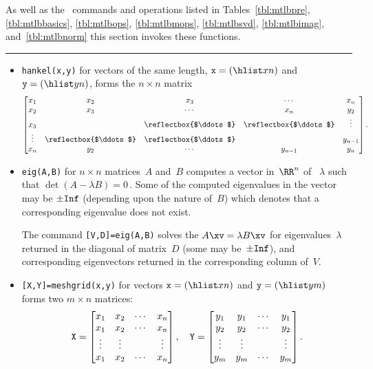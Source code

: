 \begin{table}
\caption{As well as the \script\ commands and operations listed in Tables~\ref{tbl:mtlbpre}, \ref{tbl:mtlbbasics}, \ref{tbl:mtlbops}, \ref{tbl:mtlbmops}, \ref{tbl:mtlbsvd}, \ref{tbl:mtlbimag}, and~\ref{tbl:mtlbnorm} this section invokes these functions.} \label{tbl:mtlbexpf}
\smallskip\hrule
\begin{minipage}{\linewidth}
\begin{itemize}
\item {}\verb|hankel(x,y)| for vectors of the same length, \(\verb|x|=(\hlist xn)\) and \(\verb|y|=(\hlist yn)\), forms the \(n\times n\) matrix
\def\adots{\reflectbox{$\ddots$}}
\begin{equation*}
\begin{bmatrix} 
x_1&x_2&x_3&\cdots&x_n \\
x_2&x_3&\cdots&x_n&y_2\\
x_3&&\adots&\adots&\vdots\\
\vdots&\adots&\adots&&y_{n-1}\\
x_n&y_2&\cdots&y_{n-1}&y_n
\end{bmatrix}.
\end{equation*}

\item {}\verb|eig(A,B)| for \(n\times n\) matrices~\(A\) and~\(B\) computes a vector in~\(\RR^n\) of ~\(\lambda\) such that \(\det(A-\lambda B)=0\)\,.
Some of the computed eigenvalues in the vector may be \(\pm\verb|Inf|\) (depending upon the nature of~\(B\)) which denotes that a corresponding eigenvalue does not exist.

The command \verb|[V,D]=eig(A,B)| solves the  \(A\xv=\lambda B\xv\) for eigenvalues~\(\lambda\) returned in the diagonal of matrix~\(D\) (some may be~\(\pm\verb|Inf|\)), and corresponding eigenvectors returned in the corresponding column of~\(V\).

\item {}\verb|[X,Y]=meshgrid(x,y)|  for vectors \(\verb|x|=(\hlist xn)\) and \(\verb|y|=(\hlist ym)\) forms two \(m\times n\) matrices:
\begin{equation*}
\verb|X|=\begin{bmatrix} x_1&x_2&\cdots&x_n\\
 x_1&x_2&\cdots&x_n\\
 \vdots&\vdots&&\vdots\\
 x_1&x_2&\cdots&x_n \end{bmatrix},
 \quad
\verb|Y|=\begin{bmatrix} y_1&y_1&\cdots&y_1\\
 y_2&y_2&\cdots&y_2\\
 \vdots&\vdots&&\vdots\\
 y_m&y_m&\cdots&y_m \end{bmatrix}.
\end{equation*}


\end{itemize}
\end{minipage}
\end{table}
